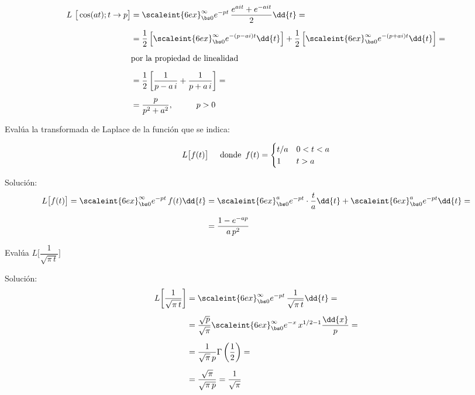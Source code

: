 \begin{ejemplo}
\begin{align*}
L \big[\cos (a t); t \to p\big] &= \scaleint{6ex}_{\bs 0}^{\infty} e^{-p t} \,\dfrac{e^{a i t} + e^{- a i t}}{2} \dd{t} = \\[0.5em]
&= \dfrac{1}{2} \left[ \scaleint{6ex}_{\bs 0}^{\infty} e^{-(p - a i) t} \dd{t} \right] + \dfrac{1}{2} \left[ \scaleint{6ex}_{\bs 0}^{\infty} e^{-(p + a i) t} \dd{t} \right] = \\[0.5em]
&\mbox{por la propiedad de linealidad  } \\[0.5em]
&= \dfrac{1}{2} \left[ \dfrac{1}{p - a \, i} + \dfrac{1}{p + a \, i}\right] = \\[0.5em]
&= \dfrac{p}{p^{2} + a^{2}}, \hspace{1cm} p > 0
\end{align*}
\end{ejemplo}
Evalúa la transformada de Laplace de la función que se indica:
\begin{ejemplo}
\begin{align*}
L\big[f(t)\big] \hspace{0.5cm} \mbox{donde} \hspace{0.5em} f(t) = \begin{cases}
t/a & 0 < t < a \\
1 & t > a
\end{cases}
\end{align*}

Solución:
\begin{align*}
L\big[f(t)\big] = \scaleint{6ex}_{\bs 0}^{\infty} e^{-p t} \, f(t) \dd{t}  &= \scaleint{6ex}_{\bs 0}^{a} e^{-p t} \cdot \dfrac{t}{a} \dd{t} + \scaleint{6ex}_{\bs 0}^{a} e^{-p t} \dd{t} = \\[0.5em]
&=\dfrac{1 - e^{- a p}}{a \, p^{2}}
\end{align*}
\end{ejemplo}
\begin{ejemplo}
Evalúa $L \bigg[\dfrac{1}{\sqrt{\pi \, t}}\bigg]$

Solución:
\begin{align*}
L \bigg[\dfrac{1}{\sqrt{\pi \, t}}\bigg] &= \scaleint{6ex}_{\bs 0}^{\infty} e^{- p t} \, \dfrac{1}{\sqrt{\pi \, t}} \dd{t} = \\[0.5em]
&= \dfrac{\sqrt{p}}{\sqrt{\pi}} \scaleint{6ex}_{\bs 0}^{\infty} e^{-x} \, x^{1/2 - 1} \dfrac{\dd{x}}{p} = \\[0.5em]
&= \dfrac{1}{\sqrt{\pi} \, p} \Gamma \left( \dfrac{1}{2} \right) = \\[0.5em]
&= \dfrac{\sqrt{\pi}}{\sqrt{\pi \, p}} = \dfrac{1}{\sqrt{\pi}}
\end{align*}
\end{ejemplo}
